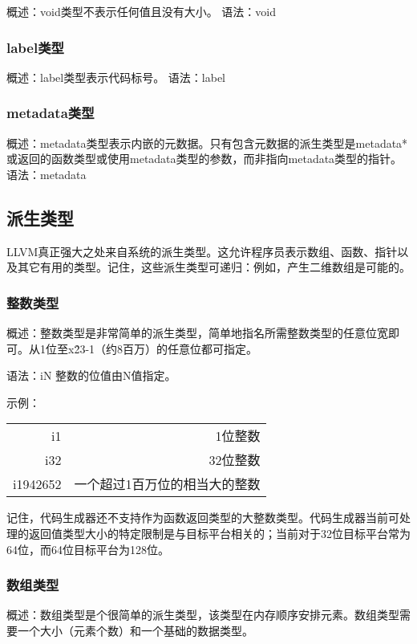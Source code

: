 \documentclass[12pt,a4paper]{article}
\begin{document}
{概述：void类型不表示任何值且没有大小。
语法：void

\subsubsection{label类型}

概述：label类型表示代码标号。
语法：label

\subsubsection{metadata类型}

概述：metadata类型表示内嵌的元数据。只有包含元数据的派生类型是metadata* 或返回的函数类型或使用metadata类型的参数，而非指向metadata类型的指针。
语法：metadata

\subsection{派生类型}

LLVM真正强大之处来自系统的派生类型。这允许程序员表示数组、函数、指针以及其它有用的类型。记住，这些派生类型可递归：例如，产生二维数组是可能的。

\subsubsection{整数类型}

概述：整数类型是非常简单的派生类型，简单地指名所需整数类型的任意位宽即可。从1位至x\^23-1（约8百万）的任意位都可指定。

语法：iN
整数的位值由N值指定。

示例：

\begin{tabular}{rr}
i1 & 1位整数 \\
i32 & 32位整数 \\
i1942652 & 一个超过1百万位的相当大的整数 \\
\end{tabular}

记住，代码生成器还不支持作为函数返回类型的大整数类型。代码生成器当前可处理的返回值类型大小的特定限制是与目标平台相关的；当前对于32位目标平台常为64位，而64位目标平台为128位。

\subsubsection{数组类型}

概述：数组类型是个很简单的派生类型，该类型在内存顺序安排元素。数组类型需要一个大小（元素个数）和一个基础的数据类型。

}
\end{document}

